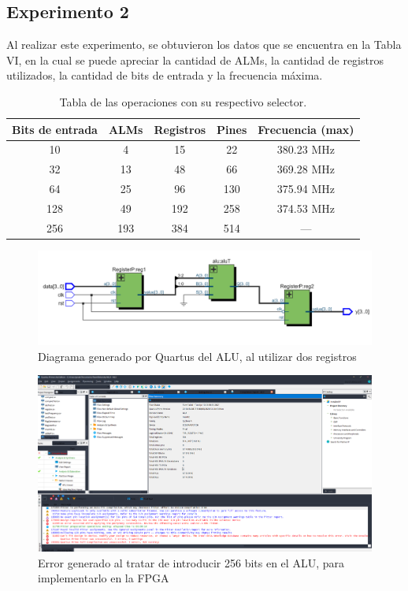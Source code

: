 \documentclass[journal]{IEEEtran}
\begin{document}
	
	\subsection{Experimento 2}
	
	Al realizar este experimento, se obtuvieron los datos que se encuentra en la Tabla VI, en la cual se puede apreciar la cantidad de ALMs, la cantidad de registros utilizados, la cantidad de bits de entrada y la frecuencia máxima. 
	
	\begin{table}[hbtp]
		\begin{center}
			\caption{Tabla de las operaciones con su respectivo selector.}
			\label{tab:tablaf}
			
			\begin{tabular}{c | c | c | c | c }
				\hline
				\textbf{Bits de entrada} & \textbf{ALMs} & \textbf{Registros} &
				\textbf{Pines} &
				\textbf{Frecuencia (max)} \\
				\hline 10 & 4 & 15 & 22 & 380.23 MHz  \\
				\hline  32 & 13 & 48 & 66 & 369.28 MHz  \\
				\hline 64 & 25 & 96 & 130 & 375.94 MHz \\
				\hline 128 & 49 & 192 & 258 & 374.53 MHz\\
				\hline 256 & 193 & 384 & 514 & ---  \\
			\end{tabular}
		\end{center}
	\end{table}
	
	\begin{figure}[hbtp]
		\centering
		\includegraphics[scale = 0.3]{img/nivel32.PNG}
		\caption{Diagrama generado por Quartus del ALU, al utilizar dos registros}
		\label{fig:niv32}
	\end{figure}
	
	\begin{figure}[hbtp]
		\centering
		\includegraphics[scale = 0.12]{img/error.png}
		\caption{Error generado al tratar de introducir 256 bits en el ALU, para implementarlo en la FPGA}
		\label{fig:err}
	\end{figure}
	
\end{document}

